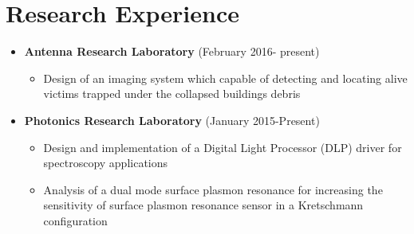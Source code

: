 \documentclass[a4paper,10pt]{article} %
\begin{document}
\section{Research Experience}
\color{Black}
\begin{itemize}
\item
		 \textbf{Antenna Research Laboratory}  \hfill{(February 2016- present)} %
		\begin{itemize}
			\item
			{Design of an imaging system which capable of detecting and locating alive victims trapped under the collapsed buildings debris }\\
		\end{itemize}
		\item
		\textbf{Photonics Research Laboratory}  \hfill{(January 2015-Present) } %
	\begin{itemize}
		\item
		{Design and implementation of a Digital Light Processor (DLP) driver for  spectroscopy applications}    
	
			\item
	Analysis of a dual mode surface plasmon resonance for increasing the sensitivity of surface plasmon resonance sensor in a Kretschmann configuration
			\end{itemize}
	
	
\end{itemize}
\color{blue}
\end{document}
